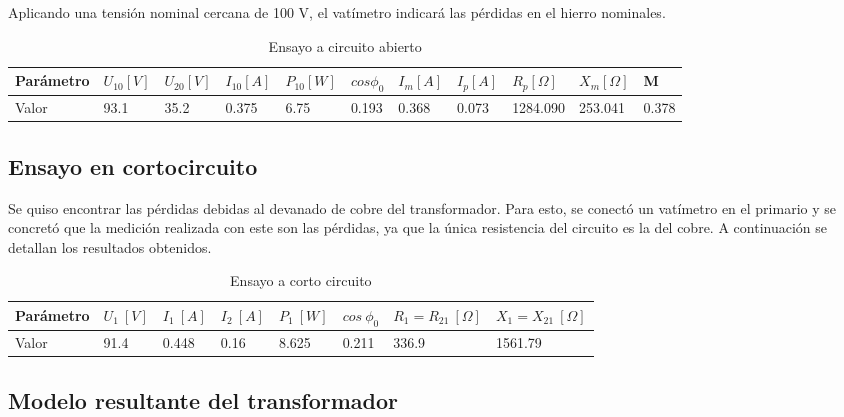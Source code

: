 \documentclass[a4paper]{article}
\begin{document}
Aplicando una tensión nominal cercana de 100 V, el vatímetro indicará las pérdidas en el hierro nominales.

\begin{table}[H]
\centering
\begin{tabular}{|l|l|l|l|l|l|l|l|l|l|l|}
\hline
Parámetro & $U_{10} [V]$ & $U_{20} [V]$ & $I_{10} [A]$ & $P_{10} [W] $ & $ cos \phi_0 $ & $I_m [A] $ & $I_p [A] $ & $ R_p [\Omega]$ & $ X_m [\Omega] $ & M     \\ \hline
Valor     & 93.1  & 35.2  & 0.375 & 6.75  & 0.193        & 0.368 & 0.073 & 1284.090 & 253.041     & 0.378 \\ \hline
\end{tabular}
\caption {Ensayo a circuito abierto}
\end{table}

\subsection{Ensayo en cortocircuito}
Se quiso encontrar las pérdidas debidas al devanado de cobre del transformador. Para esto, se conectó un vatímetro en el primario y se concretó que la medición realizada con este son las pérdidas, ya que la única resistencia del circuito es la del cobre. A continuación se detallan los resultados obtenidos.
\begin{table}[H]
\centering
\begin{tabular}{|l|l|l|l|l|l|l|l|}
\hline
Parámetro & $U_1 \ [V]$ & $I_1 \ [A]$ & $I_2 \ [A]$ & $P_1 \ [W]$ & $cos \ \phi_0 $  & $R_1 = R_21 \ [\Omega] $ & $X_1 = X_{21} \ [\Omega] $\\ \hline
Valor     & 91.4     & 0.448    & 0.16     & 8.625    & 0.211            & 336.9               & 1561.79             \\ \hline
\end{tabular}
\caption {Ensayo a corto circuito}
\centering
\end{table}
\subsection{Modelo resultante del transformador}
\end{document}
